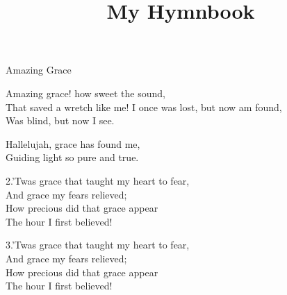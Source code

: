\documentclass[12pt]{article}
\title{My Hymnbook}
\author{}
\date{}
\begin{document}
\maketitle
\newpage

\begin{hymn}{1}{Amazing Grace}

\begin{stanza}
Amazing grace! how sweet the sound,\\
That saved a wretch like me!
I once was lost, but now am found,\\
Was blind, but now I see.
\end{stanza}

\begin{chorus}
Hallelujah, grace has found me,\\
Guiding light so pure and true.
\end{chorus}

\begin{stanza}
2.’Twas grace that taught my heart to fear,\\
And grace my fears relieved;\\
How precious did that grace appear\\
The hour I first believed!
\end{stanza}

\begin{stanza}
3.’Twas grace that taught my heart to fear,\\
And grace my fears relieved;\\
How precious did that grace appear\\
The hour I first believed!
\end{stanza}
\end{hymn}

\HymnBreak
\end{document}
